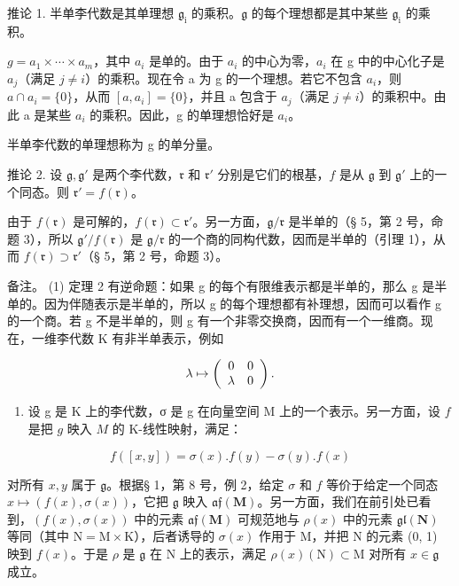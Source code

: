 推论 1. 半单李代数是其单理想 \(\mathfrak{g}_{\mathrm{i}}\) 的乘积。\(\mathfrak{g}\) 的每个理想都是其中某些 \(\mathfrak{g}_{\mathrm{i}}\) 的乘积。

\(g = a_{1} \times \cdots \times a_{m}\)，其中 \(a_{i}\) 是单的。由于 \(a_{i}\) 的中心为零，\(a_{i}\) 在 g 中的中心化子是 \(a_{j}\)（满足 \(j \neq i\)）的乘积。现在令 a 为 g 的一个理想。若它不包含 \(a_{i}\)，则 \(a \cap a_{i} = \{0\}\)，从而 \([a, a_{i}] = \{0\}\)，并且 a 包含于 \(a_{j}\)（满足 \(j \neq i\)）的乘积中。由此 a 是某些 \(a_{i}\) 的乘积。因此，g 的单理想恰好是 \(a_{i}\)。

半单李代数的单理想称为 g 的单分量。

推论 2. 设 \(\mathfrak{g},\mathfrak{g}'\) 是两个李代数，\(\mathfrak{r}\) 和 \(\mathfrak{r}'\) 分别是它们的根基，\(f\) 是从 \(\mathfrak{g}\) 到 \(\mathfrak{g}'\) 上的一个同态。则 \(\mathfrak{r}' = f(\mathfrak{r})\)。

由于 \(f(\mathfrak{r})\) 是可解的，\(f(\mathfrak{r}) \subset \mathfrak{r}'\)。另一方面，\(\mathfrak{g} / \mathfrak{r}\) 是半单的（§ 5，第 2 号，命题 3），所以 \(\mathfrak{g}' / f(\mathfrak{r})\) 是 \(\mathfrak{g} / \mathfrak{r}\) 的一个商的同构代数，因而是半单的（引理 1），从而 \(f(\mathfrak{r}) \supset \mathfrak{r}'\)（§ 5，第 2 号，命题 3）。

备注。 (1) 定理 2 有逆命题：如果 g 的每个有限维表示都是半单的，那么 g 是半单的。因为伴随表示是半单的，所以 g 的每个理想都有补理想，因而可以看作 g 的一个商。若 g 不是半单的，则 g 有一个非零交换商，因而有一个一维商。现在，一维李代数 K 有非半单表示，例如

\[
\lambda \mapsto \left( \begin{array}{c c} 0 & 0 \\ \lambda & 0 \end{array} \right).
\]

\begin{enumerate}
\def\labelenumi{(\arabic{enumi})}
\setcounter{enumi}{1}
\tightlist
\item
  设 g 是 K 上的李代数，σ 是 g 在向量空间 M 上的一个表示。另一方面，设 \(f\) 是把 \(g\) 映入 \(M\) 的 K-线性映射，满足：
\end{enumerate}

\[
f ([ x, y ]) = \sigma (x). f (y) - \sigma (y). f (x)\tag{1}
\]

对所有 \(x, y\) 属于 \(\mathfrak{g}\)。根据§ 1，第 8 号，例 2，给定 \(\sigma\) 和 \(f\) 等价于给定一个同态 \(x \mapsto (f(x), \sigma(x))\)，它把 \(\mathfrak{g}\) 映入 \(\mathfrak{af}(\mathbf{M})\)。另一方面，我们在前引处已看到，\((f(x), \sigma(x))\) 中的元素 \(\mathfrak{af}(\mathbf{M})\) 可规范地与 \(\rho(x)\) 中的元素 \(\mathfrak{gl}(\mathbf{N})\) 等同（其中 \(\mathrm{N} = \mathrm{M} \times \mathrm{K}\)），后者诱导的 \(\sigma(x)\) 作用于 \(\mathrm{M}\)，并把 \(\mathrm{N}\) 的元素 (0, 1) 映到 \(f(x)\)。于是 \(\rho\) 是 \(\mathfrak{g}\) 在 \(\mathrm{N}\) 上的表示，满足 \(\rho(x)(\mathrm{N}) \subset \mathrm{M}\) 对所有 \(x \in \mathfrak{g}\) 成立。

